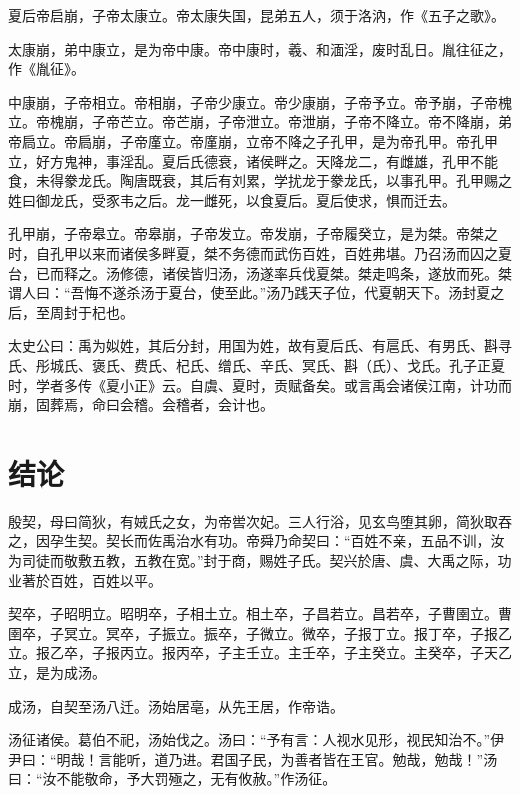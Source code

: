 \documentclass[UTF8,12pt,AutoFakeBold]{ctexart}
\begin{document}
	夏后帝启崩，子帝太康立。帝太康失国，昆弟五人，须于洛汭，作《五子之歌》。
	
	太康崩，弟中康立，是为帝中康。帝中康时，羲、和湎淫，废时乱日。胤往征之，作《胤征》。
	
	中康崩，子帝相立。帝相崩，子帝少康立。帝少康崩，子帝予立。帝予崩，子帝槐立。帝槐崩，子帝芒立。帝芒崩，子帝泄立。帝泄崩，子帝不降立。帝不降崩，弟帝扃立。帝扃崩，子帝廑立。帝廑崩，立帝不降之子孔甲，是为帝孔甲。帝孔甲立，好方鬼神，事淫乱。夏后氏德衰，诸侯畔之。天降龙二，有雌雄，孔甲不能食，未得豢龙氏。陶唐既衰，其后有刘累，学扰龙于豢龙氏，以事孔甲。孔甲赐之姓曰御龙氏，受豕韦之后。龙一雌死，以食夏后。夏后使求，惧而迁去。
	
	孔甲崩，子帝皋立。帝皋崩，子帝发立。帝发崩，子帝履癸立，是为桀。帝桀之时，自孔甲以来而诸侯多畔夏，桀不务德而武伤百姓，百姓弗堪。乃召汤而囚之夏台，已而释之。汤修德，诸侯皆归汤，汤遂率兵伐夏桀。桀走鸣条，遂放而死。桀谓人曰：“吾悔不遂杀汤于夏台，使至此。”汤乃践天子位，代夏朝天下。汤封夏之后，至周封于杞也。
	
	太史公曰：禹为姒姓，其后分封，用国为姓，故有夏后氏、有扈氏、有男氏、斟寻氏、彤城氏、褒氏、费氏、杞氏、缯氏、辛氏、冥氏、斟（氏）、戈氏。孔子正夏时，学者多传《夏小正》云。自虞、夏时，贡赋备矣。或言禹会诸侯江南，计功而崩，固葬焉，命曰会稽。会稽者，会计也。
	
	
	


	
	
	\newpage
	
	\section{结论\label{章节：黑洞吸积模型}}
	殷契，母曰简狄，有娀氏之女，为帝喾次妃。三人行浴，见玄鸟堕其卵，简狄取吞之，因孕生契。契长而佐禹治水有功。帝舜乃命契曰：“百姓不亲，五品不训，汝为司徒而敬敷五教，五教在宽。”封于商，赐姓子氏。契兴於唐、虞、大禹之际，功业著於百姓，百姓以平。
	
	契卒，子昭明立。昭明卒，子相土立。相土卒，子昌若立。昌若卒，子曹圉立。曹圉卒，子冥立。冥卒，子振立。振卒，子微立。微卒，子报丁立。报丁卒，子报乙立。报乙卒，子报丙立。报丙卒，子主壬立。主壬卒，子主癸立。主癸卒，子天乙立，是为成汤。
	
	成汤，自契至汤八迁。汤始居亳，从先王居，作帝诰。
	
	汤征诸侯。葛伯不祀，汤始伐之。汤曰：“予有言：人视水见形，视民知治不。”伊尹曰：“明哉！言能听，道乃进。君国子民，为善者皆在王官。勉哉，勉哉！”汤曰：“汝不能敬命，予大罚殛之，无有攸赦。”作汤征。
	
\end{document}
